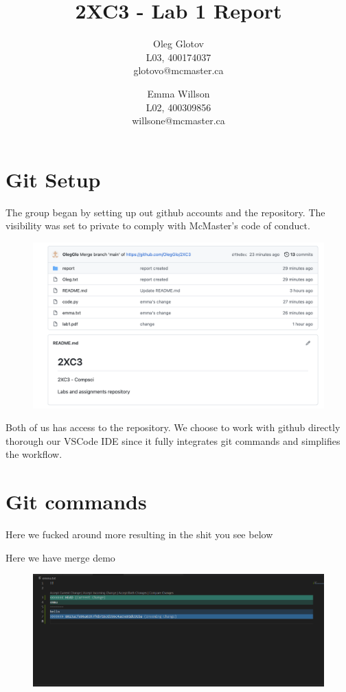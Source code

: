 \documentclass[twocolumn, 10pt]{article}
\title{2XC3 - Lab 1 Report}
\author{Oleg Glotov\\ L03, 400174037\\ glotovo@mcmaster.ca \and Emma Willson\\ L02, 400309856\\ willsone@mcmaster.ca}
\begin{document}
\maketitle
\section{Git Setup}\label{sec:git}
The group began by setting up out github accounts and the repository. The visibility was set to private to comply with McMaster's code of conduct.

\begin{figure}[H]
\includegraphics[width=\linewidth]{img1}
\end{figure}

Both of us has access to the repository. We choose to work with github directly thorough our VSCode IDE since it fully integrates git commands and simplifies the workflow.

\section{Git commands}

Here we fucked around more resulting in the shit you see below

Here we have merge demo

\begin{figure}[H]
\includegraphics[width=\linewidth]{merge}
\end{figure}
\end{document}
